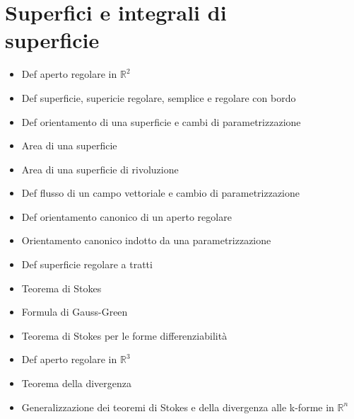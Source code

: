 \documentclass[10pt,a4paper, twocolumn]{article}
\newcommand{\R}{\mathbb{R}}
\renewcommand{\,}{\text{, }}
\begin{document}
\section{Superfici e integrali di\\superficie}
\begin{itemize}
    \item Def aperto regolare in $\R^2$
    \item Def superficie, supericie regolare, semplice e regolare con bordo
    \item Def orientamento di una superficie e cambi di parametrizzazione
    \item Area di una superficie
    \item Area di una superficie di rivoluzione
    \item Def flusso di un campo vettoriale e cambio di parametrizzazione
    \item Def orientamento canonico di un aperto regolare
    \item Orientamento canonico indotto da una parametrizzazione
    \item Def superficie regolare a tratti
    \item Teorema di Stokes
    \item Formula di Gauss-Green
    \item Teorema di Stokes per le forme differenziabilità
    \item Def aperto regolare in $\R^3$
    \item Teorema della divergenza
    \item Generalizzazione dei teoremi di Stokes e della divergenza alle k-forme in $\R^n$
\end{itemize}
\end{document}
